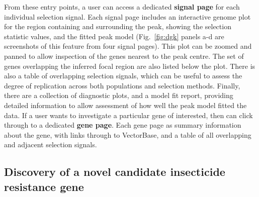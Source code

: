 \documentclass[a4paper,11pt,abstracton,hidelinks]{scrartcl}
\begin{document}
From these entry points, a user can access a dedicated \textbf{signal page} for each individual selection signal.
%
Each signal page includes an interactive genome plot for the region containing and surrounding the peak, showing the selection statistic values, and the fitted peak model (Fig.~\ref{fig:dgk} panels a-d are screenshots of this feature from four signal pages).
%
This plot can be zoomed and panned to allow inspection of the genes nearest to the peak centre.
%
The set of genes overlapping the inferred focal region are also listed below the plot.
%
There is also a table of overlapping selection signals, which can be useful to assess the degree of replication across both populations and selection methods.
%
Finally, there are a collection of diagnostic plots, and a model fit report, providing detailed information to allow assessment of how well the peak model fitted the data.
%
If a user wants to investigate a particular gene of interested, then can click through to a dedicated \textbf{gene page}.
%
Each gene page as summary information about the gene, with links through to VectorBase, and a table of all overlapping and adjacent selection signals.



\subsection{Discovery of a novel candidate insecticide resistance gene}\label{subsec:novel}
\end{document}
